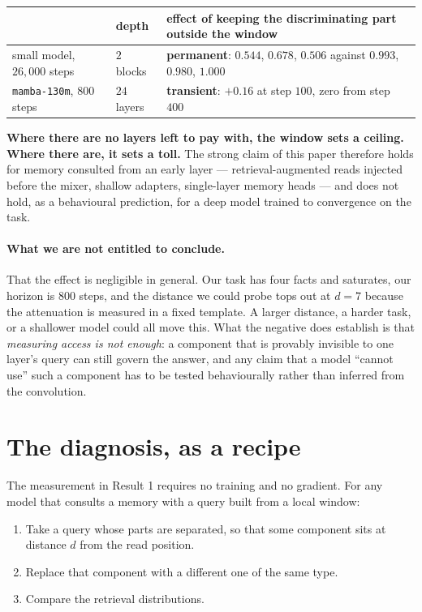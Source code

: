 \documentclass[11pt,a4paper]{article}
\begin{document}
\begin{center}
\begin{tabular}{lll}
\toprule
& depth & effect of keeping the discriminating part outside the window \\
\midrule
small model, $26{,}000$ steps & $2$ blocks & \textbf{permanent}: $0.544$, $0.678$, $0.506$ against $0.993$, $0.980$, $1.000$ \\
\texttt{mamba-130m}, $800$ steps & $24$ layers & \textbf{transient}: $+0.16$ at step $100$, zero from step $400$ \\
\bottomrule
\end{tabular}
\end{center}

\textbf{Where there are no layers left to pay with, the window sets a ceiling. Where there are, it
sets a toll.} The strong claim of this paper therefore holds for memory consulted from an early layer
--- retrieval-augmented reads injected before the mixer, shallow adapters, single-layer memory heads
--- and does not hold, as a behavioural prediction, for a deep model trained to convergence on the
task.

\paragraph{What we are not entitled to conclude.} That the effect is negligible in general. Our task
has four facts and saturates, our horizon is $800$ steps, and the distance we could probe tops out at
$d{=}7$ because the attenuation is measured in a fixed template. A larger distance, a harder task, or
a shallower model could all move this. What the negative does establish is that \emph{measuring access
is not enough}: a component that is provably invisible to one layer's query can still govern the
answer, and any claim that a model ``cannot use'' such a component has to be tested behaviourally
rather than inferred from the convolution.

\section{The diagnosis, as a recipe}

The measurement in Result 1 requires no training and no gradient. For any model that consults a memory
with a query built from a local window:

\begin{enumerate}
\item Take a query whose parts are separated, so that some component sits at distance $d$ from the read
position.
\item Replace that component with a different one of the same type.
\item Compare the retrieval distributions.
\end{enumerate}
\end{document}
